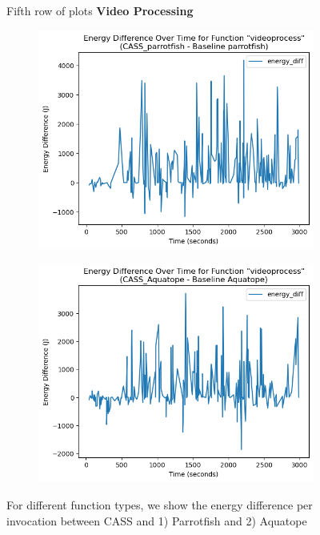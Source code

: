 \documentclass[times, 10pt,twocolumn]{article}
\begin{document}
\begin{figure}[ht]
   Fifth row of plots
   \textbf{Video Processing}\par\medskip
   \begin{subfigure}{0.4\textwidth}
      \includegraphics[width=\textwidth]{imgs/final_experiment_plots/energy_comparison/parrotfish/videoprocess.png}
     \caption{}
     \label{fig:video_energy_diff_parrotfish}
   \end{subfigure}
   \hfill
   \begin{subfigure}{0.4\textwidth}
      \includegraphics[width=\textwidth]{imgs/final_experiment_plots/energy_comparison/aquatope/videoprocess.png}
     \caption{}
     \label{fig:video_energy_diff_aquatope}
   \end{subfigure}
   \caption{For different function types, we show the energy difference per invocation between CASS and 1) Parrotfish and 2) Aquatope}
   \label{fig:end_to_end_per_invocation}
   
\end{figure}
\end{document}
